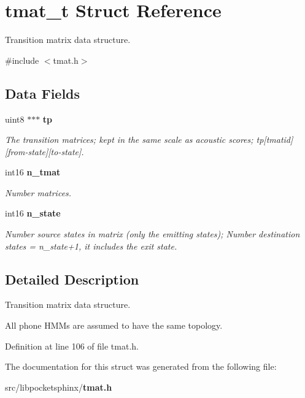 \section{tmat\-\_\-t Struct Reference}
\label{structtmat__t}


Transition matrix data structure.  




{\ttfamily \#include $<$tmat.\-h$>$}

\subsection*{Data Fields}
\begin{DoxyCompactItemize}
\item 
uint8 $\ast$$\ast$$\ast$ {\bf tp}\label{structtmat__t_a9f518c96b30dab9efdb69bd779a7b5bf}

\begin{DoxyCompactList}\small\item\em The transition matrices; kept in the same scale as acoustic scores; tp[tmatid][from-\/state][to-\/state]. \end{DoxyCompactList}\item 
int16 {\bf n\-\_\-tmat}\label{structtmat__t_ada644af34d54256f1574870d5f7a6788}

\begin{DoxyCompactList}\small\item\em Number matrices. \end{DoxyCompactList}\item 
int16 {\bf n\-\_\-state}\label{structtmat__t_a3633c71659e30cf23bee1f7efb4b4805}

\begin{DoxyCompactList}\small\item\em Number source states in matrix (only the emitting states); Number destination states = n\-\_\-state+1, it includes the exit state. \end{DoxyCompactList}\end{DoxyCompactItemize}


\subsection{Detailed Description}
Transition matrix data structure. 

All phone H\-M\-Ms are assumed to have the same topology. 

Definition at line 106 of file tmat.\-h.



The documentation for this struct was generated from the following file\-:\begin{DoxyCompactItemize}
\item 
src/libpocketsphinx/{\bf tmat.\-h}\end{DoxyCompactItemize}
